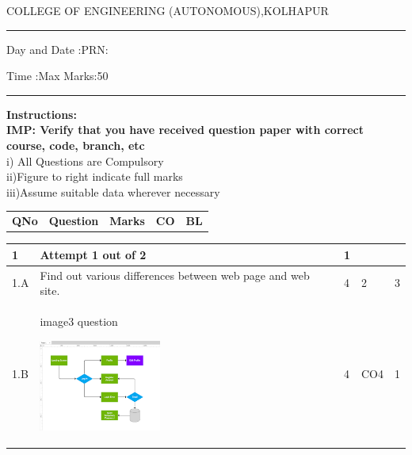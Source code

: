 \documentclass[12pt]{article}
\begin{document}
		\par
	COLLEGE OF ENGINEERING (AUTONOMOUS),KOLHAPUR
	\par\noindent\rule{\textwidth}{0.4pt}
	\centering{}\par
\centering{}\par
{}\par
\begin{flushleft}
	Day and Date :{}\hspace{5.5cm}PRN:
\end{flushleft}

\begin{flushleft}
	Time :{}\hspace{7cm}Max Marks:{50}\\
\end{flushleft}
\noindent\rule{\textwidth}{0.1pt}
\begin{flushleft}
	{\bf Instructions:}\\
	{\hspace{0.5cm} \bf IMP: Verify that you have received question paper with correct course, code, branch, etc}\\
	\hspace{1cm}i) All Questions are Compulsory\\
	\hspace{1cm}ii)Figure to right indicate full marks\\
	\hspace{1cm}iii)Assume suitable data wherever necessary\\
\end{flushleft} 

\begin{tabular}{L{1cm}C{8cm}C{2cm}C{2cm}C{1cm}}
	\bf{QNo} & 
	\bf{Question}
	
	&
	\bf{Marks}&
	\bf{CO}&
	\bf{BL}
	
	
	
\end{tabular}

		

	
	
	\begin{tabular}{|L{1cm}|L{8cm}|C{2cm}|C{2cm}|C{1cm}|}
			\bf1 & Attempt 1 out of 2 & 1 & & \\ \hline
				1.A &
	Find out various differences between web page and web site. \newline
		 &  4 & 2 & 3\\ \hline
		1.B &
	image3 question \newline
		\begin{center}
		\includegraphics[width=4cm,height=3cm]{media/diagrams/image3.png}
		\label{diagram}	
	\end{center}

	
		 &  4 & CO4 & 1\\ \hline
		\end{tabular}
\end{document}
